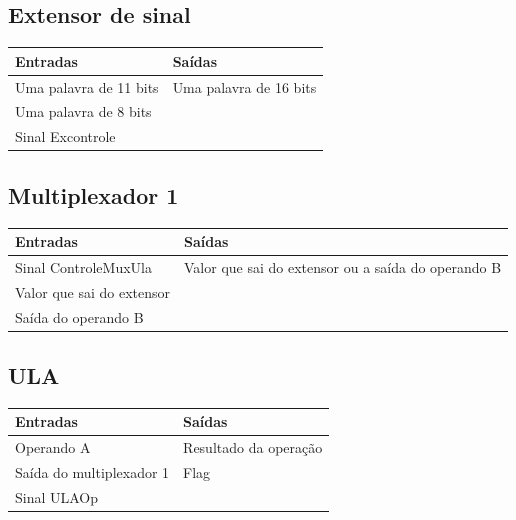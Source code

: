 \documentclass{article}
\begin{document}
 \subsection{Extensor de sinal}
  \FloatBarrier
    \begin{table}[H]
      \begin{center}
        \begin{tabular}[pos]{|m{7cm} | m{7cm}|} 
          \hline
          \cellcolor[gray]{0.9}\textbf{Entradas} & \cellcolor[gray]{0.9}\textbf{Saídas} \\ \hline
            Uma palavra de 11 bits & Uma palavra de 16 bits \\ \hline
            Uma palavra de 8 bits & \\ \hline
            Sinal Excontrole & \\ \hline
        \end{tabular}
      \end{center}
    \end{table}  
    
 \subsection{Multiplexador 1}
  \FloatBarrier
    \begin{table}[H]
      \begin{center}
        \begin{tabular}[pos]{|m{7cm} | m{7cm}|} 
          \hline
          \cellcolor[gray]{0.9}\textbf{Entradas} & \cellcolor[gray]{0.9}\textbf{Saídas} \\ \hline
            Sinal ControleMuxUla & Valor que sai do extensor ou a saída do operando B\\ \hline
            Valor que sai do extensor & \\ \hline
            Saída do operando B & \\ \hline
        \end{tabular}
      \end{center}
    \end{table}  
    
 \subsection{ULA}
  \FloatBarrier
    \begin{table}[H]
      \begin{center}
        \begin{tabular}[pos]{|m{7cm} | m{7cm}|} 
          \hline
          \cellcolor[gray]{0.9}\textbf{Entradas} & \cellcolor[gray]{0.9}\textbf{Saídas} \\ \hline
            Operando A & Resultado da operação\\ \hline
            Saída do multiplexador 1 & Flag\\ \hline
            Sinal ULAOp & \\ \hline
        \end{tabular}
      \end{center}
    \end{table}  
    
\end{document}

